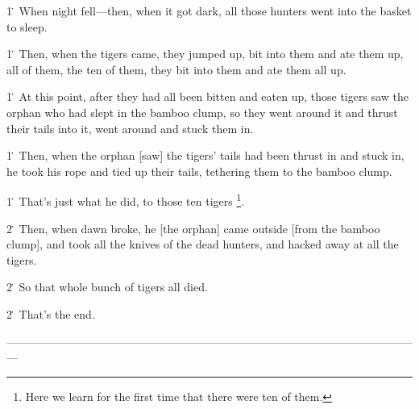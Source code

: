 1\. When night fell---then, when it got dark, all those hunters went into the basket
to sleep.

1\. Then, when the tigers came, they jumped up, bit into them and ate them up,
all of them, the ten of them, they bit into them and ate them all up.

1\. At this point, after they had all been bitten and eaten up, those tigers saw
the orphan who had slept in the bamboo clump, so they went around it and thrust
their tails into it, went around and stuck them in.

1\. Then, when the orphan [saw] the tigers' tails had been thrust in and stuck
in, he took his rope and tied up their tails, tethering them to the bamboo clump.

1\. That's just what he did, to those ten tigers \footnote{Here we learn for the first time that there were ten of them.}.

2\. Then, when dawn broke, he [the orphan] came outside [from the bamboo clump],
and took all the knives of the dead hunters, and hacked away at all the tigers.

2\. So that whole bunch of tigers all died.

2\. That's the end.

---------------------------------------------------------------------------------------------------------------

